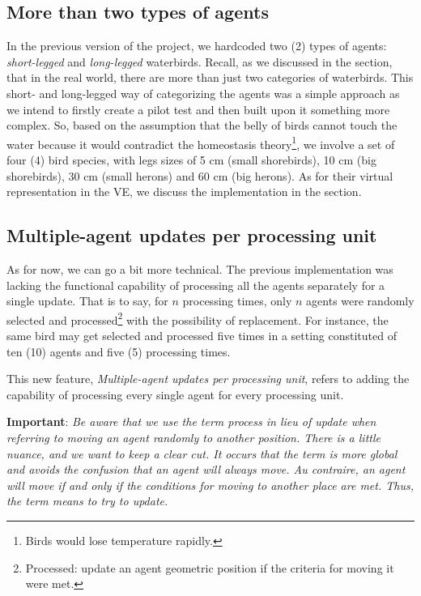 \subsection{More than two types of agents}
In the previous version of the project, we hardcoded two (2) types of agents: \emph{short-legged} and \emph{long-legged} waterbirds. Recall, as we discussed in the  section, that in the real world, there are more than just two categories of waterbirds. This short- and long-legged way of categorizing the agents was a simple approach as we intend to firstly create a pilot test and then built upon it something more complex. So, based on the assumption that the belly of birds cannot touch the water because it would contradict the homeostasis theory\footnote{Birds would lose temperature rapidly.}, we involve a set of four (4) bird species, with legs sizes of 5 cm (small shorebirds), 10 cm (big shorebirds), 30 cm (small herons) and 60 cm (big herons). As for their virtual representation in the VE, we discuss the implementation in the  section.

\subsection{Multiple-agent updates per processing unit}
As for now, we can go a bit more technical. The previous implementation was lacking the functional capability of processing all the agents separately for a single update. That is to say, for $n$ processing times, only $n$ agents were randomly selected and processed\footnote{Processed: update an agent geometric position if the criteria for moving it were met.} with the possibility of replacement. For instance, the same bird may get selected and processed five times in a setting constituted of ten (10) agents and five (5) processing times.

This new feature, \emph{Multiple-agent updates per processing unit}, refers to adding the capability of processing every single agent for every processing unit.

\noindent
\textbf{Important}: \textit{Be aware that we use the term \emph{process} in lieu of \emph{update} when referring to moving an agent randomly to another position. There is a little nuance, and we want to keep a clear cut. It occurs that the term  is more global and avoids the confusion that an agent will always move. Au contraire, an agent will move if and only if the conditions for moving to another place are met. Thus, the term  means to try to update.}

